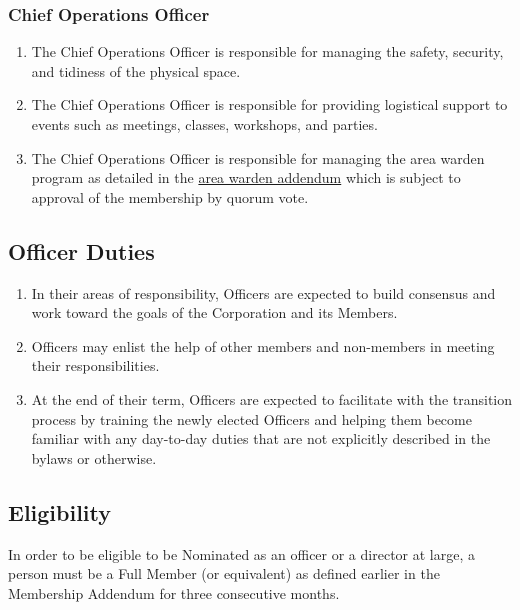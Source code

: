 \documentclass{article}
\begin{document}
  \subsubsection{Chief Operations Officer}
    \begin{enumerate}
      \item The Chief Operations Officer is responsible for managing the safety,
      security, and tidiness of the physical space.
      \item The Chief Operations Officer is responsible for providing logistical
      support to events such as meetings, classes, workshops, and parties.
      \item The Chief Operations Officer is responsible for managing the area warden
      program as detailed in the
      \href{https://github.com/Hive13/bylaws-and-membership-addendum/raw/master/warden-addendum.pdf}{area warden addendum}
      which is subject to approval of the membership by quorum vote.
    \end{enumerate}
  \subsection{Officer Duties}
    \begin{enumerate}
      \item In their areas of responsibility, Officers are expected to build consensus
      and work toward the goals of the Corporation and its Members.
      \item Officers may enlist the help of other members and non-members in meeting
      their responsibilities.
      \item At the end of their term, Officers are expected to facilitate with the
      transition process by training the newly elected Officers and helping them
      become familiar with any day-to-day duties that are not explicitly described
      in the bylaws or otherwise.
    \end{enumerate}
  \subsection{Eligibility}
    In order to be eligible to be Nominated as an officer or a director at large, a person must
    be a Full Member (or equivalent) as defined earlier in the Membership Addendum for three
    consecutive months.
\end{document}
